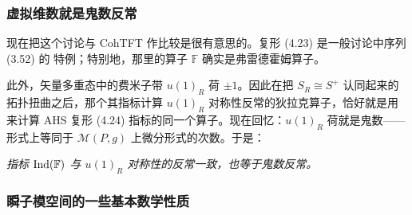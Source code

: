 \subsubsection{虚拟维数就是鬼数反常}
\label{sec:4-3-2}

现在把这个讨论与 CohTFT 作比较是很有意思的。复形 (4.23) 是一般讨论中序列 (3.52) 的
特例；特别地，那里的算子 $\mathbb{F}$ 确实是弗雷德霍姆算子。

此外，矢量多重态中的费米子带 $u(1)_R$ 荷 $\pm1$。因此在把 $S_{R}\cong S^{+}$ 认同起来的
拓扑扭曲之后，那个其指标计算 $u(1)_R$ 对称性反常的狄拉克算子，恰好就是用来计算 AHS
复形 (4.24) 指标的同一个算子。现在回忆：$u(1)_R$ 荷就是鬼数——形式上等同于
$\mathcal{M}(P,g)$ 上微分形式的次数。于是：

\begin{center}
\itshape 指标 $\operatorname{Ind}(\mathbb{F})$ 与 $u(1)_R$ 对称性的反常一致，也等于鬼数反常。
\end{center}


\subsubsection{瞬子模空间的一些基本数学性质}
\label{sec:4-3-3}

